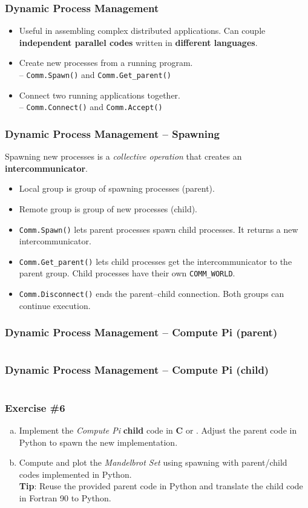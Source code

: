 \begin{frame}
  \frametitle{Dynamic Process Management}
  \begin{itemize}
  \item Useful in assembling complex distributed applications. Can
    couple \textbf{independent parallel codes} written in
    \textbf{different languages}.
  \item Create new processes from a running program.\\
    -- \texttt{Comm.Spawn()} and \texttt{Comm.Get\_parent()}
  \item Connect two running applications together.\\
    -- \texttt{Comm.Connect()} and \texttt{Comm.Accept()}
  \end{itemize}
\end{frame}

\begin{frame}
  \frametitle{Dynamic Process Management -- Spawning} Spawning new
  processes is a \emph{collective operation} that creates an
  \textbf{intercommunicator}.
  \begin{itemize}
  \item Local group is group of spawning processes (parent).
  \item Remote group is group of new processes (child).
  \item \texttt{Comm.Spawn()} lets parent processes spawn child
    processes. It returns a new intercommunicator.
  \item \texttt{Comm.Get\_parent()} lets child processes get the
    intercommunicator to the parent group. Child processes have their
    own \texttt{COMM\_WORLD}.
  \item \texttt{Comm.Disconnect()} ends the parent--child
    connection. Both groups can continue execution.
  \end{itemize}
\end{frame}

\begin{frame}[t]
  \frametitle{Dynamic Process Management -- Compute Pi (parent)}
  \small\inputminted[linenos]{python}{compute_pi-parent.py}
\end{frame}

\begin{frame}[t]
  \frametitle{Dynamic Process Management -- Compute Pi (child)}
  \small\inputminted[linenos]{python}{compute_pi-child.py}
\end{frame}

\begin{frame}
  \frametitle{Exercise \#6}
  \begin{enumerate}[a)]
  \item Implement the \emph{Compute Pi} \textbf{child} code in
    \textbf{C} or \textbf{\Cpp}. Adjust the parent code in Python to
    spawn the new implementation.
  \item Compute and plot the \emph{Mandelbrot Set} using spawning with
    parent/child codes implemented in Python.\\
    \textbf{Tip}: Reuse the provided parent code in Python and
    translate the child code in Fortran 90 to Python.
  \end{enumerate}
\end{frame}
